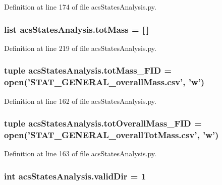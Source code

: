 Definition at line 174 of file acs\-States\-Analysis.\-py.

\hypertarget{a00098_ac2ecae6789d89cc56b0a731065837774}{
\subsubsection[{tot\-Mass}]{\setlength{\rightskip}{0pt plus 5cm}list acs\-States\-Analysis.\-tot\-Mass = \mbox{[}$\,$\mbox{]}}}\label{a00098_ac2ecae6789d89cc56b0a731065837774}


Definition at line 219 of file acs\-States\-Analysis.\-py.

\hypertarget{a00098_a1b7f5672822b59c7284cd2b703aacbc2}{
\subsubsection[{tot\-Mass\-\_\-\-F\-I\-D}]{\setlength{\rightskip}{0pt plus 5cm}tuple acs\-States\-Analysis.\-tot\-Mass\-\_\-\-F\-I\-D = open('S\-T\-A\-T\-\_\-\-G\-E\-N\-E\-R\-A\-L\-\_\-overall\-Mass.\-csv', 'w')}}\label{a00098_a1b7f5672822b59c7284cd2b703aacbc2}


Definition at line 162 of file acs\-States\-Analysis.\-py.

\hypertarget{a00098_a20a06acdb6e82bcaab87d2781d3555a9}{
\subsubsection[{tot\-Overall\-Mass\-\_\-\-F\-I\-D}]{\setlength{\rightskip}{0pt plus 5cm}tuple acs\-States\-Analysis.\-tot\-Overall\-Mass\-\_\-\-F\-I\-D = open('S\-T\-A\-T\-\_\-\-G\-E\-N\-E\-R\-A\-L\-\_\-overall\-Tot\-Mass.\-csv', 'w')}}\label{a00098_a20a06acdb6e82bcaab87d2781d3555a9}


Definition at line 163 of file acs\-States\-Analysis.\-py.

\hypertarget{a00098_aebb18ab2b73e7e2705ee42c728c0a72b}{
\subsubsection[{valid\-Dir}]{\setlength{\rightskip}{0pt plus 5cm}int acs\-States\-Analysis.\-valid\-Dir = 1}}\label{a00098_aebb18ab2b73e7e2705ee42c728c0a72b}


